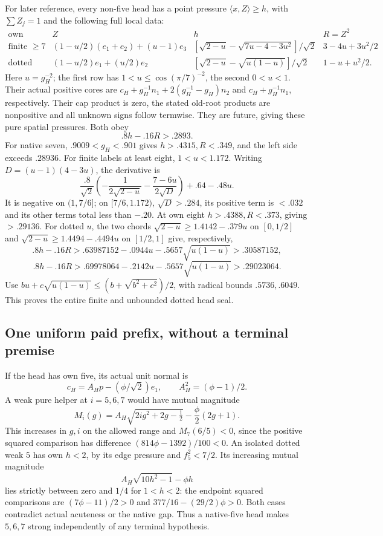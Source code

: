 \documentclass[11pt]{article}
\theoremstyle{definition}
\theoremstyle{remark}
\newcommand{\ip}[2]{\langle #1,#2\rangle}
\begin{document}
For later reference, every non-five head has a point pressure
\(\ip xZ\geq h\), with \(\sum Z_j=1\) and the following
full local data:
\[
\begin{array}{c|c|c|c}
\text{own}&Z&h&R=Z^2\\ \hline
\text{finite }\geq7&
 (1-u/2)(e_1+e_2)+(u-1)e_3&
 [\sqrt{2-u}-\sqrt{7u-4-3u^2}]/\sqrt2&
 3-4u+3u^2/2\\
\text{dotted}&(1-u/2)e_1+(u/2)e_2&
 [\sqrt{2-u}-\sqrt{u(1-u)}]/\sqrt2&
 1-u+u^2/2 .
\end{array}
\]
Here \(u=g_H^{-2}\); the first row has
\(1<u\leq\cos(\pi/7)^{-2}\), the second \(0<u<1\).
Their actual positive cores are
\(c_H+g_H^{-1}n_1+2(g_H^{-1}-g_H)n_2\)
and \(c_H+g_H^{-1}n_1\), respectively.
Their cap product is zero, the stated old-root products are
nonpositive and all unknown signs follow termwise.
They are future, giving these pure spatial pressures.
Both obey
\begin{equation}\label{app:eq:B18headF}
 .8h-.16R>.2893.
\end{equation}
For native seven, \(.9009<g_H<.901\) gives \(h>.4315,R<.349\),
and the left side exceeds \(.28936\).
For finite labels at least eight, \(1<u<1.172\).
Writing \(D=(u-1)(4-3u)\), the derivative is
\[
 \frac{.8}{\sqrt2}\left(-\frac1{2\sqrt{2-u}}
                 -\frac{7-6u}{2\sqrt D}\right)+.64-.48u.
\]
It is negative on \((1,7/6]\); on \([7/6,1.172)\),
\(\sqrt D>.284\), its positive term is \(<.032\)
and its other terms total less than \(-.20\).
At own eight \(h>.4388,R<.373\), giving \(>.29136\).
For dotted \(u\), the two chords
\(\sqrt{2-u}\geq1.4142-.379u\) on \([0,1/2]\) and
\(\sqrt{2-u}\geq1.4494-.4494u\) on \([1/2,1]\)
give, respectively,
\[
 .8h-.16R>
 .63987152-.0944u-.5657\sqrt{u(1-u)}>.30587152,
\]
\[
 .8h-.16R>
 .69978064-.2142u-.5657\sqrt{u(1-u)}>.29023064.
\]
Use
\(bu+c\sqrt{u(1-u)}\leq(b+\sqrt{b^2+c^2})/2\),
with radical bounds \(.5736,.6049\).
This proves the entire finite and unbounded dotted head seal.

\subsection{One uniform paid prefix, without a terminal premise}
\label{app:B18paidprefix}
If the head has own five, its actual unit normal is
\[
 c_H=A_Hp-(\phi/\sqrt2)e_1,\qquad A_H^2=(\phi-1)/2.
\]
A weak pure helper at \(i=5,6,7\) would have mutual magnitude
\[
 M_i(g)=A_H\sqrt{2ig^2+2g-\tfrac12}
             -\frac\phi2(2g+1).
\]
This increases in \(g,i\) on the allowed range and
\(M_7(6/5)<0\), since the positive squared comparison has
difference \((814\phi-1392)/100<0\).
An isolated dotted weak \(5\) has own \(h<2\), by its edge
pressure and \(f_5^2<7/2\). Its increasing mutual magnitude
\[
 A_H\sqrt{10h^2-1}-\phi h
\]
lies strictly between zero and \(1/4\) for \(1<h<2\):
the endpoint squared comparisons are
\((7\phi-11)/2>0\) and \(377/16-(29/2)\phi>0\).
Both cases contradict actual acuteness or the native gap.
Thus a native-five head makes \(5,6,7\) strong independently
of any terminal hypothesis.
\end{document}
